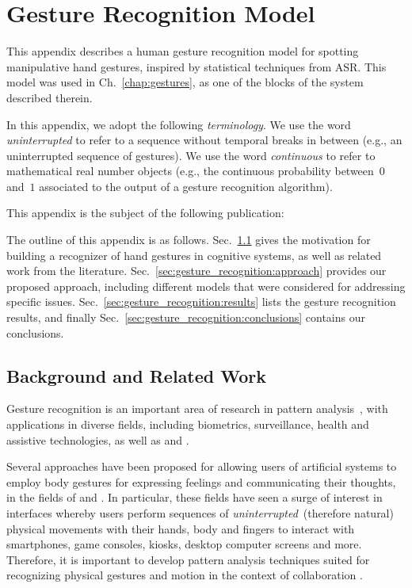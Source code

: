 
\chapter{Gesture Recognition Model}
\label{chap:gesture_recognition}

This appendix describes a human gesture recognition model for spotting manipulative hand gestures, inspired by statistical techniques from \ac{ASR}.
This model was used in Ch.~\ref{chap:gestures}, as one of the blocks of the system described therein.

In this appendix, we adopt the following \emph{terminology}.
We use the word \emph{uninterrupted} to refer to a sequence without temporal breaks in between (e.g., an uninterrupted sequence of gestures).
We use the word \emph{continuous} to refer to mathematical real number objects (e.g., the continuous probability between~$0$ and~$1$ associated to the output of a gesture recognition algorithm).

This appendix is the subject of the following publication:
\listPublicationsAppendixGestureRecognition

The outline of this appendix is as follows.
Sec.~\ref{sec:gesture_recognition:background} gives the motivation for building a recognizer of hand gestures in cognitive systems, as well as related work from the literature.
Sec.~\ref{sec:gesture_recognition:approach} provides our proposed approach, including different models that were considered for addressing specific issues.
Sec.~\ref{sec:gesture_recognition:results} lists the gesture recognition results, and finally
Sec.~\ref{sec:gesture_recognition:conclusions} contains our conclusions.

\section{Background and Related Work}
\label{sec:gesture_recognition:background}

Gesture recognition is an important area of research in pattern analysis~\cite{aggarwal:2011}, with applications in diverse fields, including biometrics, surveillance, health and assistive technologies, as well as \hci{} \cite{wigdor:2011,rautaray:2015:survey} and \hri{} \cite{waldherr:2000:ar,yang:2007:tro,bauer:2008:ijhr}.

Several approaches have been proposed for allowing users of artificial systems to employ body gestures for expressing feelings and communicating their thoughts, in the fields of \hci{} \cite{wigdor:2011,rautaray:2015:survey} and \hri{} \cite{waldherr:2000:ar,yang:2007:tro,bauer:2008:ijhr}.
In particular, these fields have seen a surge of interest in interfaces whereby users perform sequences of \emph{uninterrupted}~(therefore natural) physical movements with their hands, body and fingers to interact with smartphones, game consoles, kiosks, desktop computer screens and more.
Therefore, it is important to develop pattern analysis techniques suited for recognizing physical gestures and motion in the context of \hr{} collaboration \cite{kanda:2003:ijcai,dragan:2013:hri,dragan:2014:ar,dragan:2015:hri}.

